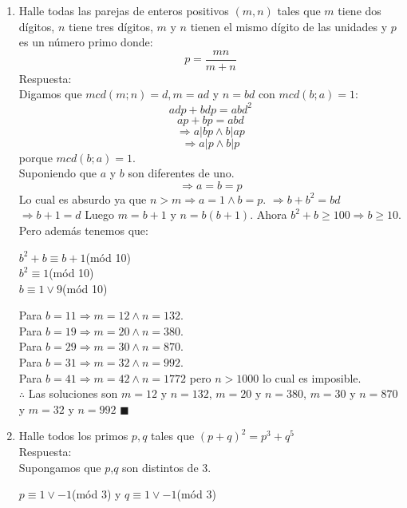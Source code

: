\documentclass{book}
\begin{document}
\begin{enumerate}
    \item  Halle todas las parejas de enteros positivos $(m,n)$ tales que $m$ tiene dos dígitos, $n$ tiene tres dígitos, $m$ y                    $n$ tienen el mismo dígito de las unidades y $p$ es un número primo donde:
          $$p=\frac{mn}{m+n}$$
          Respuesta:\\
          Digamos que $mcd(m;n) = d, m = ad$ y $n = bd$ con $mcd(b;a) = 1$:
          $$adp + bdp = abd^2$$
          $$ap + bp = abd$$
          $$\Rightarrow a |bp    \wedge   b| ap $$
          $$\Rightarrow a| p    \wedge   b |p $$
          porque $mcd(b;a) =1$. \\
          Suponiendo que $a$ y $b$ son diferentes de uno.
          $$\Rightarrow a=b=p$$
          Lo cual es absurdo ya que $n > m \Rightarrow a = 1 \wedge b=p$. $\Rightarrow                b + b^2 = bd$
          $\Rightarrow b + 1 = d$ Luego $m = b + 1$ y $n = b(b + 1)$. Ahora $b^2 + b                        \geq 100 \Rightarrow b \geq 10$. Pero además tenemos que:
          \begin{center}
              $b^2 + b \equiv b + 1$(mód 10)\\
              $b^2 \equiv 1$(mód 10)\\
              $b \equiv 1 \vee 9$(mód 10)\\
          \end{center}
          Para $b= 11 \Rightarrow m = 12 \wedge n = 132$. \\
          Para $b = 19 \Rightarrow m = 20 \wedge n = 380$. \\
          Para $b = 29 \Rightarrow m = 30 \wedge n = 870$. \\
          Para $b = 31 \Rightarrow m = 32 \wedge n = 992$. \\
          Para $ b = 41 \Rightarrow m= 42 \wedge n = 1772$ pero $n > 1000$ lo cual es imposible. \\
          $\therefore$ Las soluciones son $m= 12$ y $n= 132$, $m= 20$ y $n= 380$, $m= 30$ y $n= 870$ y $m= 32$ y $n= 992$ $\blacksquare$\\
    \item Halle todos los primos $p,q$ tales que ${(p+q)}^2 = p^3+q^5$ \\
          Respuesta:\\
          Supongamos que $p$,$q$ son distintos de 3.
          \begin{center}
              $p\equiv 1 \vee -1$(mód 3)  y $q\equiv 1 \vee -1$(mód 3)
          \end{center}

\end{enumerate}
\end{document}
